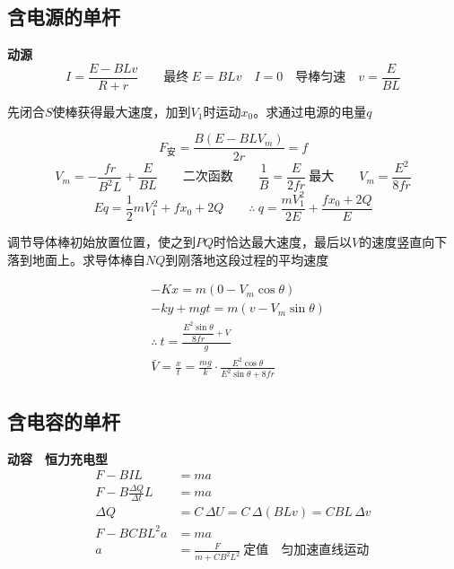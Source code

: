 \subsection{含电源的单杆}
\textbf{动源}
\[
I=\frac{E-BLv}{R+r}\qquad\text{最终}\ E=BLv\quad I=0\quad\text{导棒匀速}\quad v=\frac{E}{BL}
\]

\begin{problem}[圈注“求和”]
先闭合$S$使棒获得最大速度，加到$V_1$时运动$x_0$。求通过电源的电量$q$
\begin{solution}
\[
F_{\text{安}}=\frac{B(E-BLV_m)}{2r}=f
\]
\[
V_m=-\frac{fr}{B^2L}+\frac{E}{BL}\qquad\text{二次函数}\qquad \frac1B=\frac{E}{2fr}\ \text{最大}\qquad V_m=\frac{E^2}{8fr}
\]
\[
Eq=\frac12mV_1^{\,2}+fx_0+2Q\qquad\therefore\ q=\frac{mV_1^{2}}{2E}+\frac{fx_0+2Q}{E}
\]
\end{solution}
\end{problem}
\begin{problem}
调节导体棒初始放置位置，使之到$PQ$时恰达最大速度，最后以$V$的速度竖直向下落到地面上。求导体棒自$NQ$到刚落地这段过程的平均速度
\begin{solution}
\medskip
\noindent\hspace{2cm}
\begin{align*}
&-Kx=m(0-V_m\cos\theta)\\
&-ky+mgt=m(v-V_m\sin\theta)\\
&\therefore\ t=\frac{\dfrac{E^2\sin\theta}{8fr}+V}{g}\\
&\bar V=\frac{x}{t}=\frac{mg}{k}\cdot\frac{E^2\cos\theta}{E^2\sin\theta+8fr}
\end{align*}
\end{solution}
\end{problem}

\subsection{含电容的单杆}
\textbf{动容}　\textbf{恒力充电型}
\begin{align*}
F-BIL&=ma\\
F-B\frac{\Delta Q}{\Delta t}L&=ma\\
\Delta Q&=C\,\Delta U=C\,\Delta(BLv)=CBL\,\Delta v\\
F-BCBL^{2}a&=ma\\
a&=\frac{F}{m+CB^2L^2}\ \text{定值}\quad\text{匀加速直线运动}
\end{align*}

